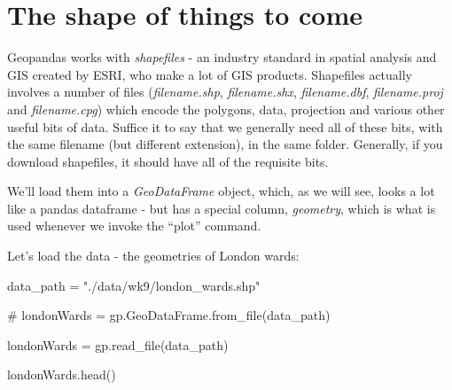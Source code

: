 \documentclass[
  letterpaper,
  DIV=11,
  numbers=noendperiod]{scrreprt}
\newenvironment{Shaded}{\begin{snugshade}}{\end{snugshade}}
\newcommand{\CommentTok}[1]{\textcolor[rgb]{0.37,0.37,0.37}{#1}}
\newcommand{\NormalTok}[1]{\textcolor[rgb]{0.00,0.23,0.31}{#1}}
\newcommand{\OperatorTok}[1]{\textcolor[rgb]{0.37,0.37,0.37}{#1}}
\newcommand{\StringTok}[1]{\textcolor[rgb]{0.13,0.47,0.30}{#1}}
\begin{document}
\hypertarget{the-shape-of-things-to-come}{%
\section{The shape of things to
come}\label{the-shape-of-things-to-come}}

Geopandas works with \emph{shapefiles} - an industry standard in spatial
analysis and GIS created by ESRI, who make a lot of GIS products.
Shapefiles actually involves a number of files (\emph{filename.shp},
\emph{filename.shx}, \emph{filename.dbf}, \emph{filename.proj} and
\emph{filename.cpg}) which encode the polygons, data, projection and
various other useful bits of data. Suffice it to say that we generally
need all of these bits, with the same filename (but different
extension), in the same folder. Generally, if you download shapefiles,
it should have all of the requisite bits.

We'll load them into a \emph{GeoDataFrame} object, which, as we will
see, looks a lot like a pandas dataframe - but has a special column,
\emph{geometry}, which is what is used whenever we invoke the ``plot''
command.

Let's load the data - the geometries of London wards:

\begin{Shaded}
\begin{Highlighting}[]
\NormalTok{data\_path }\OperatorTok{=} \StringTok{"./data/wk9/london\_wards.shp"}

\CommentTok{\# londonWards = gp.GeoDataFrame.from\_file(data\_path)}

\NormalTok{londonWards }\OperatorTok{=}\NormalTok{ gp.read\_file(data\_path)}

\NormalTok{londonWards.head()}
\end{Highlighting}
\end{Shaded}
\end{document}
